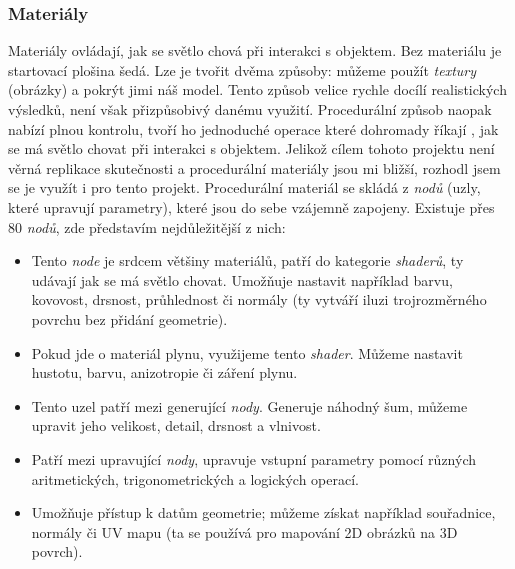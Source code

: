 \newpage

\subsubsection{Materiály}
{Materiály ovládají, jak se světlo chová při interakci s objektem. Bez materiálu je startovací plošina šedá.}\odst
{Lze je tvořit dvěma způsoby: můžeme použít \textit{textury} (obrázky) a pokrýt jimi náš model. Tento způsob velice rychle docílí realistických výsledků, není však přizpůsobivý danému využití. Procedurální způsob naopak nabízí plnou kontrolu, tvoří ho jednoduché operace které dohromady říkají , jak se má světlo chovat při interakci s objektem.}\odst
{Jelikož cílem tohoto projektu není věrná replikace skutečnosti a procedurální materiály jsou mi bližší, rozhodl jsem se je využít i pro tento projekt. Procedurální materiál se skládá z \textit{nodů} (uzly, které upravují parametry), které jsou do sebe vzájemně zapojeny. Existuje přes 80 \textit{nodů}, zde představím nejdůležitější z nich:}

\begin{itemize}
    \item {}\par
        {Tento \textit{node} je srdcem většiny materiálů, patří do kategorie \textit{shaderů}, ty udávají jak se má světlo chovat. Umožňuje nastavit například barvu, kovovost, drsnost, průhlednost či normály (ty vytváří iluzi trojrozměrného povrchu bez přidání geometrie).}
    \item {}\par
        {Pokud jde o materiál plynu, využijeme tento \textit{shader}. Můžeme nastavit hustotu, barvu, anizotropie či záření plynu.}
    \item {}\par
        {Tento uzel patří mezi generující \textit{nody}. Generuje náhodný šum, můžeme upravit jeho velikost, detail, drsnost a vlnivost.}
    \item {}\par
        {Patří mezi upravující \textit{nody}, upravuje vstupní parametry pomocí různých aritmetických, trigonometrických a logických operací.}
    \item {}\par
        {Umožňuje přístup k datům geometrie; můžeme získat například souřadnice, normály či UV mapu (ta se používá pro mapování 2D obrázků na 3D povrch).}
\end{itemize}

